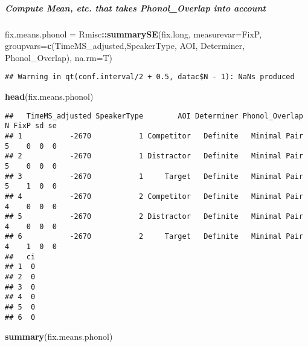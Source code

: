 \documentclass[
]{article}
\newenvironment{Shaded}{\begin{snugshade}}{\end{snugshade}}
\newcommand{\AttributeTok}[1]{\textcolor[rgb]{0.13,0.29,0.53}{#1}}
\newcommand{\FunctionTok}[1]{\textcolor[rgb]{0.13,0.29,0.53}{\textbf{#1}}}
\newcommand{\NormalTok}[1]{#1}
\newcommand{\OtherTok}[1]{\textcolor[rgb]{0.56,0.35,0.01}{#1}}
\newcommand{\SpecialCharTok}[1]{\textcolor[rgb]{0.81,0.36,0.00}{\textbf{#1}}}
\newcommand{\StringTok}[1]{\textcolor[rgb]{0.31,0.60,0.02}{#1}}
\begin{document}
\subparagraph{Compute Mean, etc. that takes Phonol\_Overlap into
account}\label{compute-mean-etc.-that-takes-phonol_overlap-into-account}

\begin{Shaded}
\begin{Highlighting}[]
\NormalTok{fix.means.phonol }\OtherTok{=}\NormalTok{ Rmisc}\SpecialCharTok{::}\FunctionTok{summarySE}\NormalTok{(fix.long, }\AttributeTok{measurevar=}\StringTok{\textquotesingle{}FixP\textquotesingle{}}\NormalTok{, }\AttributeTok{groupvars=}\FunctionTok{c}\NormalTok{(}\StringTok{\textquotesingle{}TimeMS\_adjusted\textquotesingle{}}\NormalTok{,}\StringTok{\textquotesingle{}SpeakerType\textquotesingle{}}\NormalTok{, }\StringTok{\textquotesingle{}AOI\textquotesingle{}}\NormalTok{, }\StringTok{\textquotesingle{}Determiner\textquotesingle{}}\NormalTok{, }\StringTok{\textquotesingle{}Phonol\_Overlap\textquotesingle{}}\NormalTok{), }\AttributeTok{na.rm=}\NormalTok{T)}
\end{Highlighting}
\end{Shaded}

\begin{verbatim}
## Warning in qt(conf.interval/2 + 0.5, datac$N - 1): NaNs produced
\end{verbatim}

\begin{Shaded}
\begin{Highlighting}[]
\FunctionTok{head}\NormalTok{(fix.means.phonol)}
\end{Highlighting}
\end{Shaded}

\begin{verbatim}
##   TimeMS_adjusted SpeakerType        AOI Determiner Phonol_Overlap N FixP sd se
## 1           -2670           1 Competitor   Definite   Minimal Pair 5    0  0  0
## 2           -2670           1 Distractor   Definite   Minimal Pair 5    0  0  0
## 3           -2670           1     Target   Definite   Minimal Pair 5    1  0  0
## 4           -2670           2 Competitor   Definite   Minimal Pair 4    0  0  0
## 5           -2670           2 Distractor   Definite   Minimal Pair 4    0  0  0
## 6           -2670           2     Target   Definite   Minimal Pair 4    1  0  0
##   ci
## 1  0
## 2  0
## 3  0
## 4  0
## 5  0
## 6  0
\end{verbatim}

\begin{Shaded}
\begin{Highlighting}[]
\FunctionTok{summary}\NormalTok{(fix.means.phonol)}
\end{Highlighting}
\end{Shaded}
\end{document}
